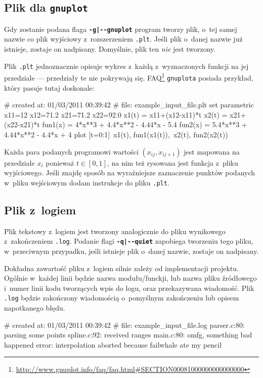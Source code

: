 \documentclass[10pt,a4paper]{article}
\newcommand{\prog}[1]{\texttt{#1}}
\newcommand{\flag}[1]{\textbf{\prog{#1}}}
\begin{document}
\subsection{Plik dla \texttt{gnuplot}}
\label{sec:plik_gnuplot}

Gdy zostanie podana flaga \flag{-g|-\--gnuplot} program tworzy plik, o~tej samej
nazwie co plik wyjściowy z~rozszerzeniem \prog{.plt}. Jeśli plik o~danej nazwie
już istnieje, zostaje on nadpisany. Domyślnie, plik ten \emph{nie} jest
tworzony.

Plik \prog{.plt} jednoznacznie opisuje wykres z~każdą z~wyznaczonych funkcji
na jej przedziale --- przedziały te nie pokrywają się.
FAQ\footnote{\url{http://www.gnuplot.info/faq/faq.html\#SECTION00081000000000000000}}
\texttt{gnuplota} posiada przykład, który pasuje tutaj doskonale:
\vspace{-12pt}
\begin{SmallVerbatim}
    # created at: 01/03/2011 00:39:42
    #       file: example_input_file.plt
    set parametric
    x11=12
    x12=71.2
    x21=71.2
    x22=92.0
    x1(t) = x11+(x12-x11)*t
    x2(t) = x21+(x22-x21)*t
    fun1(x) = 4*x**3 + 4.4*x**2 - 4.44*x - 5.4
    fun2(x) = 5.4*x**3 + 4.44*x**2 - 4.4*x + 4
    plot [t=0:1]\
      x1(t), fun1(x1(t)),\
      x2(t), fun2(x2(t))
\end{SmallVerbatim}

Każda para podanych programowi wartości $(x_{ij}, x_{ij+1})$ jest mapowana na
przedziale $x_{i}$ ponieważ $t \in [0,1]$, na nim też rysowana jest funkcja
z~pliku wyjściowego. Jeśli znajdę sposób na wyraźniejsze zaznaczenie punktów
podanych w~pliku wejściowym dodam instrukcje do pliku \prog{.plt}.

\subsection{Plik z~logiem}
\label{sec:plik_log}

Plik tekstowy z~logiem jest tworzony analogicznie do pliku wynikowego
z~zakończeniem \prog{.log}. Podanie flagi \flag{-q|-\--quiet} zapobiega tworzeniu
tego pliku, w~przeciwnym przypadku, jeśli istnieje plik o~danej nazwie, zostaje
on nadpisany.

Dokładna zawartość pliku z~logiem silnie zależy od implementacji projektu.
Ogólnie w~każdej linii będzie nazwa modułu/funckji, lub nazwa pliku źródłowego
i~numer linii kodu tworzących wpis do logu, oraz przekazywana wiadomość. Plik
\prog{.log} będzie zakończony wiadomością o~pomyślnym zakończeniu lub opisem
napotkanego błędu.
\vspace{-12pt}
\begin{SmallVerbatim}
    # created at: 01/03/2011 00:39:42
    #       file: example_input_file.log
    parser.c:80: parsing some points
    spline.c:92: received ranges
    main.c:80: omfg, something bad happened
    error: interpolation aborted because failwhale ate my pencil
\end{SmallVerbatim}
\end{document}
